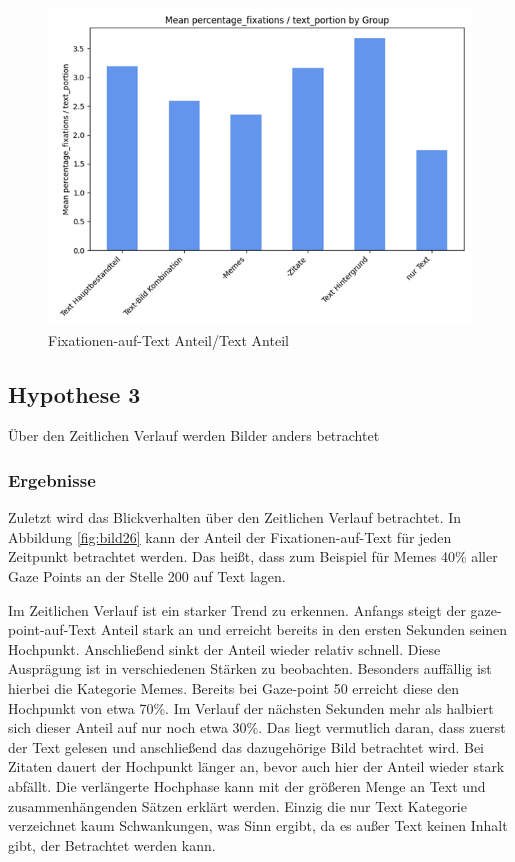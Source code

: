 \documentclass[
    language=german, %
    thesis=seminar, %
    supervisor=postdoc, %
    multiauthor=true, %
    ]{settings/csssa-thesis}
\begin{document}
\begin{figure}[h]
    \centering
    \includegraphics[width=\linewidth,height=0.8\textheight,keepaspectratio]{figures/Bild30.png}
    \caption{Fixationen-auf-Text Anteil/Text Anteil}\label{fig:bild25}
\end{figure}

\subsection{Hypothese 3}
Über den Zeitlichen Verlauf werden Bilder anders betrachtet

\subsubsection{Ergebnisse}
Zuletzt wird das Blickverhalten über den Zeitlichen Verlauf betrachtet. In Abbildung \ref{fig:bild26} kann der 
Anteil der Fixationen-auf-Text für jeden Zeitpunkt betrachtet werden. Das heißt, dass zum Beispiel 
für Memes 40\% aller Gaze Points an der Stelle 200 auf Text lagen. 


Im Zeitlichen Verlauf ist ein starker Trend zu erkennen. Anfangs steigt der gaze-point-auf-Text Anteil stark an und erreicht 
bereits in den ersten Sekunden seinen Hochpunkt. Anschließend sinkt der Anteil wieder relativ schnell. 
Diese Ausprägung ist in verschiedenen Stärken zu beobachten. Besonders auffällig ist hierbei die Kategorie Memes. 
Bereits bei Gaze-point 50 erreicht diese den Hochpunkt von etwa 70\%. Im Verlauf der nächsten Sekunden 
mehr als halbiert sich dieser Anteil auf nur noch etwa 30\%. Das liegt vermutlich daran, dass zuerst der Text 
gelesen und anschließend das dazugehörige Bild betrachtet wird. Bei Zitaten dauert der Hochpunkt länger an, 
bevor auch hier der Anteil wieder stark abfällt. Die verlängerte Hochphase kann mit der größeren Menge an Text 
und zusammenhängenden Sätzen erklärt werden. Einzig die nur Text Kategorie verzeichnet kaum Schwankungen, 
was Sinn ergibt, da es außer Text keinen Inhalt gibt, der Betrachtet werden kann. 
\end{document}
